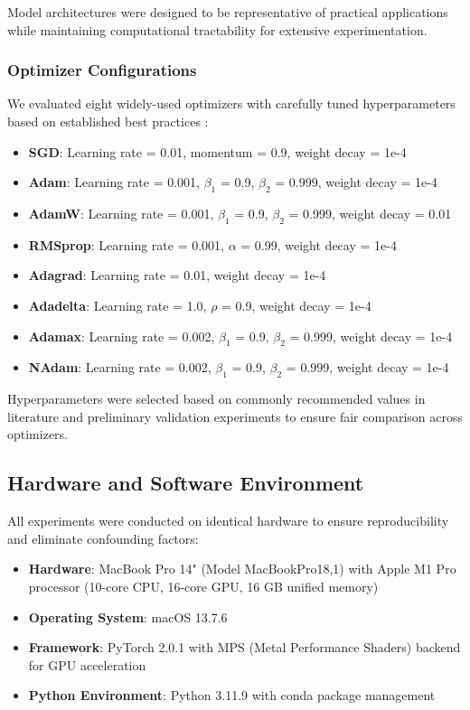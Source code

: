 \documentclass[conference]{IEEEtran}
\begin{document}
Model architectures were designed to be representative of practical applications while maintaining computational tractability for extensive experimentation.

\subsubsection{Optimizer Configurations}

We evaluated eight widely-used optimizers with carefully tuned hyperparameters based on established best practices \cite{ruder2016overview}:

\begin{itemize}
    \item \textbf{SGD}: Learning rate = 0.01, momentum = 0.9, weight decay = 1e-4
    \item \textbf{Adam}: Learning rate = 0.001, $\beta_1$ = 0.9, $\beta_2$ = 0.999, weight decay = 1e-4
    \item \textbf{AdamW}: Learning rate = 0.001, $\beta_1$ = 0.9, $\beta_2$ = 0.999, weight decay = 0.01
    \item \textbf{RMSprop}: Learning rate = 0.001, $\alpha$ = 0.99, weight decay = 1e-4
    \item \textbf{Adagrad}: Learning rate = 0.01, weight decay = 1e-4
    \item \textbf{Adadelta}: Learning rate = 1.0, $\rho$ = 0.9, weight decay = 1e-4
    \item \textbf{Adamax}: Learning rate = 0.002, $\beta_1$ = 0.9, $\beta_2$ = 0.999, weight decay = 1e-4
    \item \textbf{NAdam}: Learning rate = 0.002, $\beta_1$ = 0.9, $\beta_2$ = 0.999, weight decay = 1e-4
\end{itemize}

Hyperparameters were selected based on commonly recommended values in literature and preliminary validation experiments to ensure fair comparison across optimizers.

\subsection{Hardware and Software Environment}

All experiments were conducted on identical hardware to ensure reproducibility and eliminate confounding factors:

\begin{itemize}
    \item \textbf{Hardware}: MacBook Pro 14" (Model MacBookPro18,1) with Apple M1 Pro processor (10-core CPU, 16-core GPU, 16 GB unified memory)
    \item \textbf{Operating System}: macOS 13.7.6
    \item \textbf{Framework}: PyTorch 2.0.1 with MPS (Metal Performance Shaders) backend for GPU acceleration
    \item \textbf{Python Environment}: Python 3.11.9 with conda package management
\end{itemize}
\end{document}
